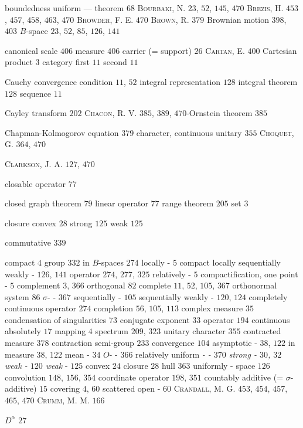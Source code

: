boundedness uniform --- theorem $68$ \textsc{Bourbaki}, N. $23$, $52$, $145$, $470$ \textsc{Brezis}, H. $453$, $457$, $458$, $463$, $470$ \textsc{Browder}, F. E. $470$ \textsc{Brown}, R. $379$ Brownian motion $398$, $403$ $B$-space $23$, $52$, $85$, $126$, $141$

canonical scale $406$ measure $406$ carrier (= support) $26$ \textsc{Cartan}, E. $400$ Cartesian product $3$ category first $11$ second $11$

Cauchy convergence condition $11$, $52$ integral representation $128$ integral theorem $128$ sequence $11$

Cayley transform $202$ \textsc{Chacon}, R. V. $385$, $389$, $470$-Ornstein theorem $385$

Chapman-Kolmogorov equation $379$ character, continuous unitary $355$ \textsc{Choquet}, G. $364$, $470$

\textsc{Clarkson}, J. A. $127$, $470$

closable operator $77$

closed graph theorem $79$ linear operator $77$ range theorem $205$ set $3$

closure convex $28$ strong $125$ weak $125$

commutative $339$ 

compact $4$ group $332$ in $B$-spaces $274$ locally - $5$ compact locally sequentially weakly - $126$, $141$ operator $274$, $277$, $325$ relatively - $5$ compactification, one point - $5$ complement $3$, $366$ orthogonal $82$ complete $11$, $52$, $105$, $367$ orthonormal system $86$ $\sigma$- - $367$ sequentially - $105$ sequentially weakly - $120$, $124$ completely continuous operator $274$ completion $56$, $105$, $113$ complex measure $35$ condensation of singularities $73$ conjugate exponent $33$ operator $194$ continuous absolutely $17$ mapping $4$ spectrum $209$, $323$ unitary character $355$ contracted measure $378$ contraction semi-group $233$ convergence $104$ asymptotic - $38$, $122$ in measure $38$, $122$ mean - $34$ $O$- - $366$ relatively uniform \emph{- - $370$ strong - $30$, $32$ weak - $120$ weak} - $125$ convex $24$ closure $28$ hull $363$ uniformly - space $126$ convolution $148$, $156$, $354$ coordinate operator $198$, $351$ countably additive (= $\sigma$-additive) $15$ covering $4$, $60$ scattered open - $60$ \textsc{Crandall}, M. G. $453$, $454$, $457$, $465$, $470$ \textsc{Crumm}, M. M. $166$

$D^{\alpha}$ $27$ 

